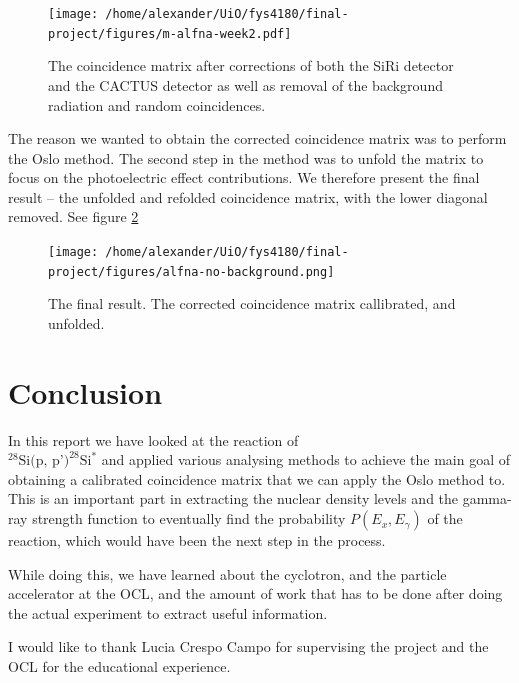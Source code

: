 \documentclass[a4paper,12pt]{article}
\begin{document}
\begin{figure}[H]
    \centering
    \texttt{[image: /home/alexander/UiO/fys4180/final-project/figures/m-alfna-week2.pdf]}
    \caption{The coincidence matrix after corrections of both the SiRi detector and the CACTUS detector as well as removal of the background radiation
        and random coincidences.}
    \label{fig:coincidence-corrected-final}
\end{figure}

The reason we wanted to obtain the corrected coincidence matrix was
to perform the Oslo method. The second step in the method was
to unfold the matrix to focus on the photoelectric effect contributions.
We therefore present the final result -- the unfolded and refolded
coincidence matrix, with the lower diagonal removed.
See figure \ref{fig:refolded-matrix}

\begin{figure}[H]
    \centering
    \texttt{[image: /home/alexander/UiO/fys4180/final-project/figures/alfna-no-background.png]}
    \caption{The final result. The corrected coincidence matrix callibrated,
    and unfolded.}
    \label{fig:refolded-matrix}
\end{figure}

\section{Conclusion}
In this report we have looked at the reaction of\\ 
$^{28}\text{Si(p, p')}^{28}\text{Si}^*$ and applied various
analysing methods to achieve the main goal of
obtaining a calibrated coincidence matrix that we
can apply the Oslo method to.
This is an important part in extracting the nuclear density levels
and the gamma-ray strength function to eventually find the 
probability $P(E_x,E_\gamma)$
of the reaction, which would have been the next step in the process. 

While doing this, we have learned about the cyclotron,
and the particle accelerator at the OCL, and the amount of work that
has to be done after doing the actual experiment to extract
useful information.

I would like to thank Lucia Crespo Campo for supervising the project
and the OCL for the educational experience.
\end{document}
